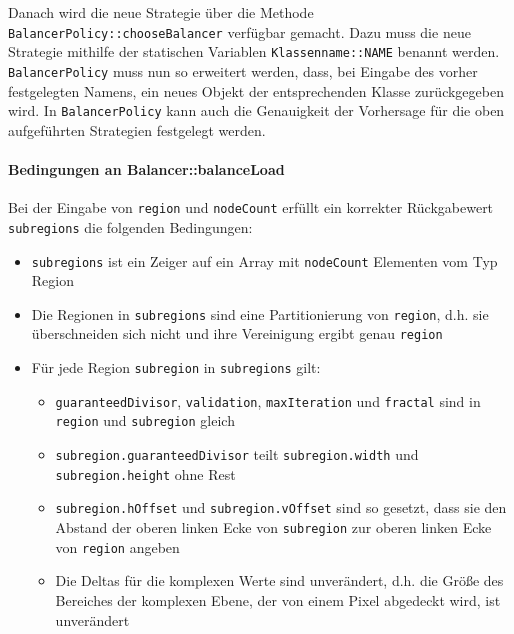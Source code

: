 \begin{figure}
	
\end{figure}

Danach wird die neue Strategie über die Methode \verb|BalancerPolicy::chooseBalancer| verfügbar gemacht.
Dazu muss die neue Strategie mithilfe der statischen Variablen \verb|Klassenname::NAME| benannt werden.
\verb|BalancerPolicy| muss nun so erweitert werden, dass, bei Eingabe des vorher festgelegten Namens, ein neues Objekt der entsprechenden Klasse zurückgegeben wird.
In \verb|BalancerPolicy| kann auch die Genauigkeit der Vorhersage für die oben aufgeführten Strategien festgelegt werden.

\paragraph*{Bedingungen an Balancer::balanceLoad}
Bei der Eingabe von \verb|region| und \verb|nodeCount| erfüllt ein korrekter Rückgabewert \verb|subregions| die folgenden Bedingungen:
\begin{itemize}
	\item \verb|subregions| ist ein Zeiger auf ein Array mit \verb|nodeCount| Elementen vom Typ Region
	\item Die Regionen in \verb|subregions| sind eine Partitionierung von \verb|region|, d.h. sie überschneiden sich nicht und ihre Vereinigung ergibt genau \verb|region|
	\item Für jede Region \verb|subregion| in \verb|subregions| gilt:
	      \begin{itemize}
		      \item \verb|guaranteedDivisor|, \verb|validation|, \verb|maxIteration| und \verb|fractal| sind in \verb|region| und \verb|subregion| gleich
		      \item \verb|subregion.guaranteedDivisor| teilt \verb|subregion.width| und \\ \verb|subregion.height| ohne Rest
		      \item \verb|subregion.hOffset| und \verb|subregion.vOffset| sind so gesetzt, dass sie den Abstand der oberen linken Ecke von \verb|subregion| zur oberen linken Ecke von \verb|region| angeben
		      \item Die Deltas für die komplexen Werte sind unverändert, d.h. die Größe des Bereiches der komplexen Ebene, der von einem Pixel abgedeckt wird, ist unverändert
	      \end{itemize}
\end{itemize}

